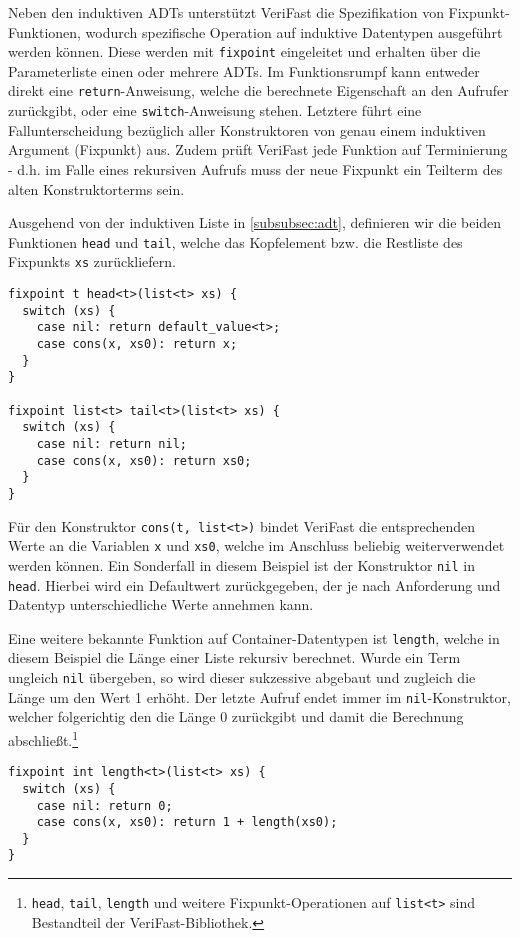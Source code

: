 Neben den induktiven ADTs unterstützt VeriFast die Spezifikation von Fix\-punkt-Funktionen, wodurch spezifische Operation auf induktive Datentypen ausgeführt werden können. Diese werden mit \texttt{fixpoint} eingeleitet und erhalten über die Parameterliste einen oder mehrere ADTs. Im Funktionsrumpf kann entweder direkt eine \texttt{return}-Anweisung, welche die berechnete Eigenschaft an den Aufrufer zurückgibt, oder eine \texttt{switch}-Anweisung stehen. Letztere führt eine Fallunterscheidung bezüglich aller Konstruktoren von genau einem induktiven Argument (Fixpunkt) aus. Zudem prüft VeriFast jede Funktion auf Terminierung - d.h. im Falle eines rekursiven Aufrufs muss der neue Fixpunkt ein Teilterm des alten Konstruktorterms sein. \cite{Jacobs2010}

Ausgehend von der induktiven Liste in \cref{subsubsec:adt}, definieren wir die beiden Funktionen \texttt{head} und \texttt{tail}, welche das Kopfelement bzw. die Restliste des Fixpunkts \texttt{xs} zurückliefern.

\begin{lstlisting}
fixpoint t head<t>(list<t> xs) {
  switch (xs) {
    case nil: return default_value<t>;
    case cons(x, xs0): return x;
  }
}

fixpoint list<t> tail<t>(list<t> xs) {
  switch (xs) {
    case nil: return nil;
    case cons(x, xs0): return xs0;
  }
}
\end{lstlisting}

\noindent
Für den Konstruktor \texttt{cons(t, list<t>)} bindet VeriFast die entsprechenden Werte an die Variablen \texttt{x} und \texttt{xs0}, welche im Anschluss beliebig weiterverwendet werden können. Ein Sonderfall in diesem Beispiel ist der Konstruktor \texttt{nil} in \texttt{head}. Hierbei wird ein Defaultwert zurückgegeben, der je nach Anforderung und Datentyp unterschiedliche Werte annehmen kann.

Eine weitere bekannte Funktion auf Container-Datentypen ist \texttt{length}, welche in diesem Beispiel die Länge einer Liste rekursiv berechnet. Wurde ein Term ungleich \texttt{nil} übergeben, so wird dieser sukzessive abgebaut und zugleich die Länge um den Wert 1 erhöht. Der letzte Aufruf endet immer im \texttt{nil}-Konstruktor, welcher folgerichtig den die Länge 0 zurückgibt und damit die Berechnung abschließt.\footnote{\texttt{head}, \texttt{tail}, \texttt{length} und weitere Fixpunkt-Operationen auf \texttt{list<t>} sind Bestandteil der VeriFast-Bibliothek.}

\begin{lstlisting}
fixpoint int length<t>(list<t> xs) {
  switch (xs) {
    case nil: return 0;
    case cons(x, xs0): return 1 + length(xs0);
  }
}
\end{lstlisting}

